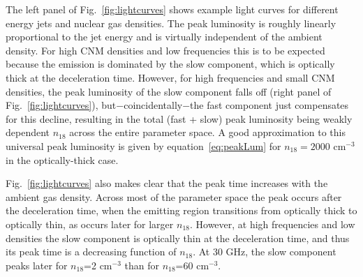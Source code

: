 \documentclass[usenatbib,fleqn]{mnras}
\begin{document}
The left panel of Fig.~\ref{fig:lightcurves} shows example light
curves for different energy jets and nuclear gas densities. The peak
luminosity is roughly linearly proportional to the jet energy and is
virtually independent of the ambient density.  For high CNM densities
and low frequencies this is to be expected because the emission is
dominated by the slow component, which is optically thick at the
deceleration time.  However, for high frequencies and small CNM
densities, the peak luminosity of the slow component falls off (right
panel of Fig.~\ref{fig:lightcurves}), but$-$coincidentally$-$the fast
component just compensates for this decline, resulting in the total
(fast + slow) peak luminosity being weakly dependent $n_{18}$
across the entire parameter space.  A good approximation to this
universal peak luminosity is given by equation~\ref{eq:peakLum} for
$n_{18}=2000$ cm$^{-3}$ in the optically-thick case.

Fig.~\ref{fig:lightcurves} also makes clear that the peak time
increases with the ambient gas density.  Across most of the parameter
space the peak occurs after the deceleration time, when the emitting
region transitions from optically thick to optically thin, as occurs
later for larger $n_{18}$. However, at high frequencies and low
densities the slow component is optically thin at the deceleration
time, and thus its peak time is a decreasing function of $n_{18}$. At
30 GHz, the slow component peaks later for $n_{18}$=2 cm$^{-3}$ than
for $n_{18}$=60 cm$^{-3}$.
\end{document}
